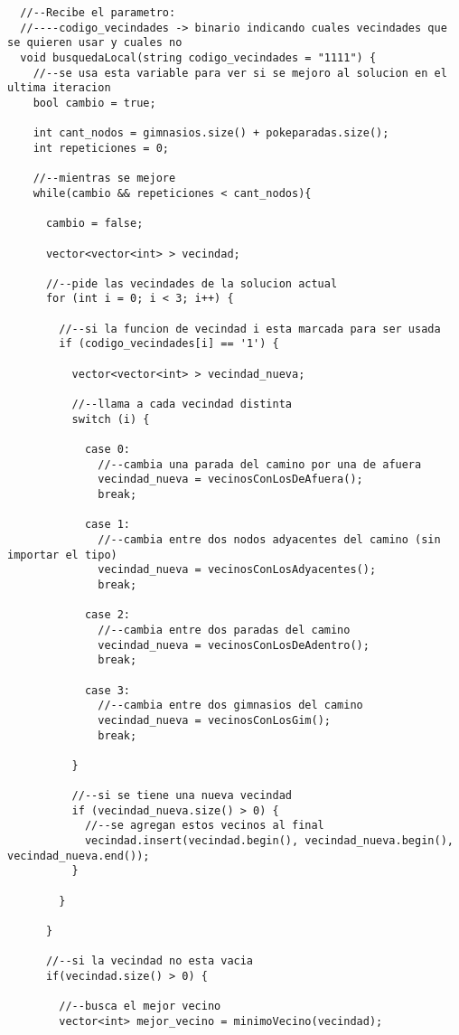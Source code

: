 \begin{lstlisting}
  //--Recibe el parametro:
  //----codigo_vecindades -> binario indicando cuales vecindades que se quieren usar y cuales no
  void busquedaLocal(string codigo_vecindades = "1111") {
    //--se usa esta variable para ver si se mejoro al solucion en el ultima iteracion
    bool cambio = true;

    int cant_nodos = gimnasios.size() + pokeparadas.size();
    int repeticiones = 0;

    //--mientras se mejore
    while(cambio && repeticiones < cant_nodos){

      cambio = false;

      vector<vector<int> > vecindad;

      //--pide las vecindades de la solucion actual
      for (int i = 0; i < 3; i++) {

        //--si la funcion de vecindad i esta marcada para ser usada
        if (codigo_vecindades[i] == '1') {

          vector<vector<int> > vecindad_nueva;

          //--llama a cada vecindad distinta
          switch (i) {

            case 0:
              //--cambia una parada del camino por una de afuera
              vecindad_nueva = vecinosConLosDeAfuera();
              break;

            case 1:
              //--cambia entre dos nodos adyacentes del camino (sin importar el tipo)
              vecindad_nueva = vecinosConLosAdyacentes();
              break;

            case 2:
              //--cambia entre dos paradas del camino
              vecindad_nueva = vecinosConLosDeAdentro();
              break;

            case 3:
              //--cambia entre dos gimnasios del camino
              vecindad_nueva = vecinosConLosGim();
              break;

          }

          //--si se tiene una nueva vecindad
          if (vecindad_nueva.size() > 0) {
            //--se agregan estos vecinos al final
            vecindad.insert(vecindad.begin(), vecindad_nueva.begin(), vecindad_nueva.end());
          }

        }

      }

      //--si la vecindad no esta vacia
      if(vecindad.size() > 0) {

        //--busca el mejor vecino
        vector<int> mejor_vecino = minimoVecino(vecindad);


\end{lstlisting}
